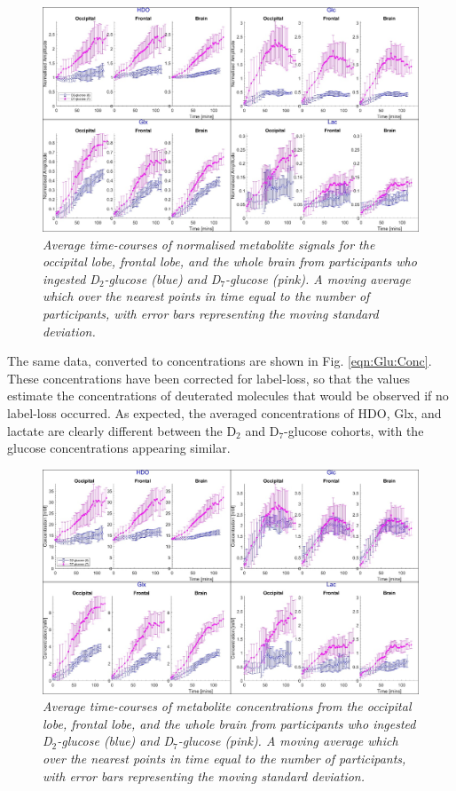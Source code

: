 \begin{figure}
    \centering
    \includegraphics[width = 1\textwidth]{Figures/Glucose/Avg_Amp.png}
    \caption{\textit{Average time-courses of normalised metabolite signals for the occipital lobe, frontal lobe, and the whole brain from participants who ingested D$_2$-glucose (blue) and D$_7$-glucose (pink). A moving average which over the nearest points in time equal to the number of participants, with error bars representing the moving standard deviation.}}
    \label{fig:Glu:Avg_Amp}
\end{figure}

The same data, converted to concentrations are shown in Fig. \ref{eqn:Glu:Conc}. These concentrations have been corrected for label-loss, so that the values estimate the concentrations of deuterated molecules that would be observed if no label-loss occurred. As expected, the averaged concentrations of \ac{HDO}, Glx, and lactate are clearly different between the D$_2$ and D$_7$-glucose cohorts, with the glucose concentrations appearing similar. 

\begin{figure}
    \centering
    \includegraphics[width = 1\textwidth]{Figures/Glucose/Avg_Conc.png}
    \caption{\textit{Average time-courses of metabolite concentrations from the occipital lobe, frontal lobe, and the whole brain from participants who ingested D$_2$-glucose (blue) and D$_7$-glucose (pink). A moving average which over the nearest points in time equal to the number of participants, with error bars representing the moving standard deviation.}}
    \label{fig:Glu:Avg_Conc}
\end{figure}

